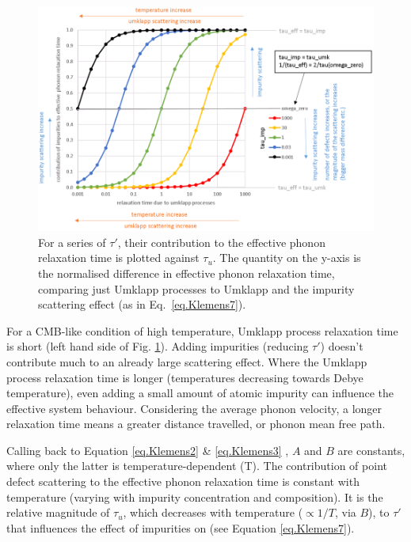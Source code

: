 \begin{figure}[h!]
  \includegraphics[width=\linewidth]{Figures/effective-phonon-relaxation-time.png}
  \caption{For a series of ${\tau}'$, their contribution to the effective phonon relaxation time is plotted against $\tau_{u}$. The quantity on the y-axis is the normalised difference in effective phonon relaxation time, comparing just Umklapp processes to Umklapp and the impurity scattering effect (as in Eq.~\ref{eq.Klemens7}). }
  \label{fig:relaxation_time}
\end{figure}

For a CMB-like condition of high temperature, Umklapp process relaxation time is short (left hand side of Fig. \ref{fig:relaxation_time}). Adding impurities (reducing ${\tau}'$) doesn't contribute much to an already large scattering effect. Where the Umklapp process relaxation time is longer (temperatures decreasing towards Debye temperature), even adding a small amount of atomic impurity can influence the effective system behaviour. Considering the average phonon velocity, a longer relaxation time means a greater distance travelled, or phonon mean free path.

Calling back to Equation \ref{eq.Klemens2} \& \ref{eq.Klemens3} , $A$ and $B$ are constants, where only the latter is temperature-dependent (T). The contribution of point defect scattering to the effective phonon relaxation time is constant with temperature (varying with impurity concentration and composition). It is the relative magnitude of $\tau_{u}$, which decreases with temperature ($\propto 1/T$, via $B$), to ${\tau}'$ that influences the effect of impurities on \tcs (see Equation \ref{eq.Klemens7}).
 
